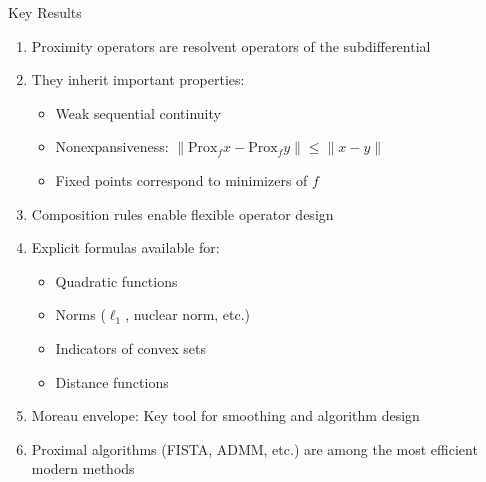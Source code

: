 \documentclass[aspectratio=169,10pt]{beamer}
\begin{document}
\begin{frame}{Key Results}
\begin{enumerate}
    \item Proximity operators are resolvent operators of the subdifferential
    \vspace{0.15cm}

    \item They inherit important properties:
    \begin{itemize}
        \item Weak sequential continuity
        \item Nonexpansiveness: $\|\mathrm{Prox}_f x - \mathrm{Prox}_f y\| \leq \|x - y\|$
        \item Fixed points correspond to minimizers of $f$
    \end{itemize}

    \vspace{0.2cm}

    \item Composition rules enable flexible operator design

    \vspace{0.15cm}

    \item Explicit formulas available for:
    \begin{itemize}
        \item Quadratic functions
        \item Norms ($\ell_1$, nuclear norm, etc.)
        \item Indicators of convex sets
        \item Distance functions
    \end{itemize}

    \vspace{0.2cm}

    \item Moreau envelope: Key tool for smoothing and algorithm design

    \vspace{0.15cm}

    \item Proximal algorithms (FISTA, ADMM, etc.) are among the most efficient modern methods
\end{enumerate}
\end{frame}
\end{document}
